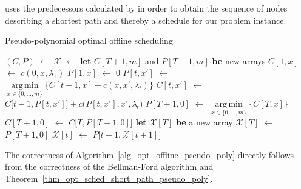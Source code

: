 \documentclass[hidelinks]{article}
\newcommand\Let[2]{\State #1 $\gets$ #2}
\newcommand\Blet[2]{\State \textbf{let} #1 \textbf{be} #2}
\theoremstyle{plain}
\theoremstyle{definition}
\theoremstyle{rem}
\DeclareMathOperator*{\argmin}{arg\,min}
\newcommand{\mx}{\mathcal{X}}
\newcommand{\costs}{c}
\newcommand{\fromto}[2]{\{#1,\ldots,#2\}}
\begin{document}
 uses the predecessors calculated by  in order to obtain the sequence of nodes describing a shortest path and thereby a schedule for our problem instance.
\begin{algorithm}[H]
  \caption{Pseudo-polynomial optimal offline scheduling}
  \begin{algorithmic}[1]
	  \Let{$(C,P)$}{}
	  \Let{$\mx$}{\Call{extract\_schedule}{$P,T$}}
	  \State \Return{$\mx$}
  \EndFunction
  \Statex
	\Blet{$C[T+1,m]$ and $P[T+1,m]$}{new arrays}
		\Let{$C[1,x]$}{$\costs(0,x,\lambda_1)$}
		\Let{$P[1,x]$}{$0$}
	\EndFor
			\Let{$P[t,x']$}{$\argmin\limits_{x\in\fromto{0}{m}}\bigl\{C[t-1,x]+\costs(x,x',\lambda_t)\bigr\}$}
			\Let{$C[t,x']$}{$C\bigl[t-1,P[t,x']\bigr]+c\bigl(P[t,x'],x',\lambda_t\bigr)$}
		\EndFor
	\EndFor
	\Let{$P[T+1,0]$}{$\argmin\limits_{x\in\fromto{0}{m}}\bigl\{C[T,x]\bigr\}$}
	\Let{$C[T+1,0]$}{$C\bigl[T,P[T+1,0]\bigr]$}
	\State {}
  \EndFunction
  \Statex
	\Blet{$\mx[T]$}{a new array}
    	\Let{$\mx[T]$}{$P[T+1,0]$}
		\Let{$\mx[t]$}{$P\bigl[t+1,\mx[t+1]\bigr]$}
	\EndFor
	\State \Return{$\mx$}
  \EndFunction

  \end{algorithmic}
\label{alg_opt_offline_pseudo_poly}
\end{algorithm}
The correctness of Algorithm~\ref{alg_opt_offline_pseudo_poly} directly follows from the correctness of the Bellman-Ford algorithm and Theorem~\ref{thm_opt_sched_short_path_pseudo_poly}.
\end{document}
